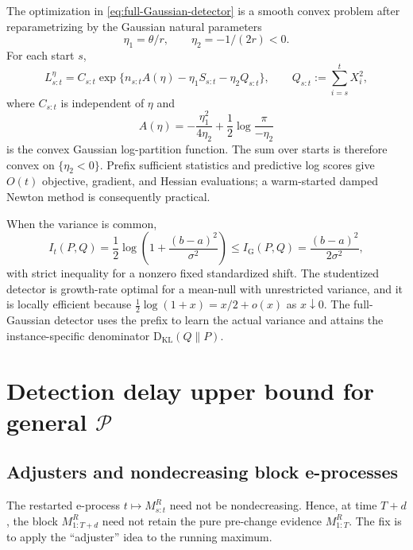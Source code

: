 \documentclass[12pt]{article}
\theoremstyle{spaced}
\theoremstyle{remark}
\newcommand{\calP}{\mathcal P}
\newcommand{\KL}{\mathrm{D}_{\text{KL}}}
\begin{document}
The optimization in \eqref{eq:full-Gaussian-detector} is a smooth
convex problem after reparametrizing by the Gaussian natural parameters
\[
  \eta_1=\theta/r,
  \qquad
  \eta_2=-1/(2r)<0.
\]
For each start $s$,
\[
  L_{s:t}^{\eta}
  =C_{s:t}
   \exp\{n_{s:t}A(\eta)-\eta_1S_{s:t}-\eta_2Q_{s:t}\},
  \qquad
  Q_{s:t}:=\sum_{i=s}^tX_i^2,
\]
where $C_{s:t}$ is independent of $\eta$ and
\[
  A(\eta)
  =-\frac{\eta_1^2}{4\eta_2}
    +\frac12\log\frac{\pi}{-\eta_2}
\]
is the convex Gaussian log-partition function.  The sum over starts is
therefore convex on $\{\eta_2<0\}$.  Prefix sufficient statistics and
predictive log scores give $O(t)$ objective, gradient, and Hessian
evaluations; a warm-started damped Newton method is consequently practical.

When the variance is common,
\begin{equation}
\label{eq:t-vs-full-info}
  I_t(P,Q)
  =\frac12\log\left(1+\frac{(b-a)^2}{\sigma^2}\right)
  \le
  I_{\mathrm G}(P,Q)
  =\frac{(b-a)^2}{2\sigma^2},
\end{equation}
with strict inequality for a nonzero fixed standardized shift.  The
studentized detector is growth-rate optimal for a mean-null with unrestricted
variance, and it is locally efficient because
$\tfrac12\log(1+x)=x/2+o(x)$ as $x\downarrow0$.  The full-Gaussian detector
uses the prefix to learn the actual variance and attains the
instance-specific denominator $\KL(Q\|P)$.  


\section{Detection delay upper bound for general $\calP$}\label{sec:upper-bdd}
\subsection{Adjusters and nondecreasing block e-processes}

The restarted e-process $t\mapsto M_{s:t}^R$ need not be nondecreasing.  Hence, at time $T+d$, the block $M_{1:T+d}^R$ need not retain the pure pre-change evidence $M_{1:T}^R$.  The fix is to apply the ``adjuster'' idea \citep{choe2026combining} to the running maximum.
\end{document}
